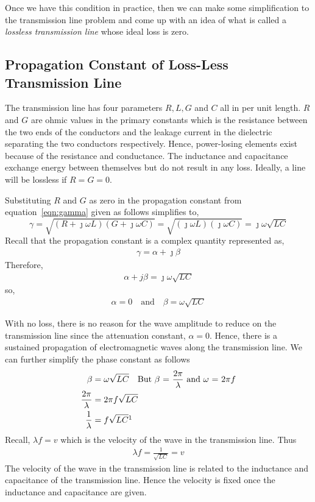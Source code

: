 Once we have this condition in practice, then we can make some simplification to the transmission line problem and come up with an idea of what is called a \emph{lossless transmission line} whose ideal loss is zero.

\subsection{Propagation Constant of Loss-Less Transmission Line}
The transmission line has four parameters $R, L, G$ and $C$ all in per unit length. $R$ and $G$ are ohmic values in the primary constants which is the resistance between the two ends of the conductors and the leakage current in the dielectric separating the two conductors respectively. Hence, power-losing elements exist because of the resistance and conductance. The inductance and capacitance exchange energy between themselves but do not result in any loss. Ideally, a line will be lossless if $R = G = 0$.

Substituting $R$ and $G$ as zero in the propagation constant from equation~\eqref{eqn:gamma} given as follows simplifies to,
\begin{dmath*}
\gamma = \sqrt{(R + \jmath\omega L)(G + \jmath\omega C)}
= \sqrt{(\jmath\omega L)(\jmath\omega C)}
= \jmath\omega\sqrt{LC}
\end{dmath*}
Recall that the propagation constant is a complex quantity represented as,
\begin{align*}
\gamma = \alpha + \jmath\beta
\end{align*} 
Therefore,
\begin{align*}
\alpha + j\beta = \jmath\omega\sqrt{LC}
\end{align*}
so,
\begin{align*}
\alpha = 0\quad\text{and}\quad\beta = \omega\sqrt{LC}
\end{align*}

With no loss, there is no reason for the wave amplitude to reduce on the transmission line since the attenuation constant, $\alpha = 0$. Hence, there is a sustained propagation of electromagnetic waves along the transmission line. We can further simplify the phase constant as follows
\begin{align*}
\beta &= \omega\sqrt{LC}\quad\text{But }\beta\text{ = }\frac{2\pi}{\lambda}\text{ and }\omega\text{ = }2\pi f\\
\frac{2\pi}{\lambda} &= 2\pi f\sqrt{LC}\\
\frac{1}{\lambda} &= f\sqrt{LC}\footnotemark
\end{align*}
Recall, $\lambda f = v$ which is the velocity of the wave in the transmission line. Thus
\begin{align*}
\lambda f = \frac{1}{\sqrt{LC}} = v
\end{align*}
The velocity of the wave in the transmission line is related to the inductance and capacitance of the transmission line. Hence the velocity is fixed once the inductance and capacitance are given.

